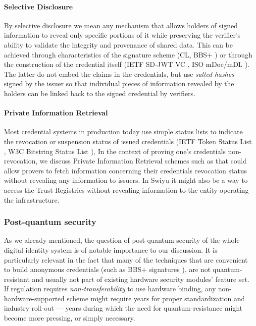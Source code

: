 \paragraph{Selective Disclosure} By selective disclosure we mean any mechanism that allows holders of signed information to reveal only specific portions of it while preserving the verifier's ability to validate the integrity and provenance of shared data. This can be achieved through characteristics of the signature scheme (CL, BBS+ \cite{ASM06}) or through the construction of the credential itself (IETF SD-JWT VC \cite{SDJWT}, ISO mDoc/mDL \cite{ISO18013-5_2021}).
The latter do not embed the claims in the credentials, but use \emph{salted hashes} signed by the issuer so that individual pieces of information revealed by the holders can be linked back to the signed credential by verifiers.

\paragraph{Private Information Retrieval} Most credential systems in production today use simple status lists to indicate the revocation or suspension status of issued credentials (IETF Token Status List \cite{TSL}, W3C Bitstring Status List \cite{W3C-status-lists}), In the context of proving one's credentials non-revocation, we discuss Private Information Retrieval schemes such as \cite{MW22} that could allow provers to fetch information concerning their credentials revocation status without revealing any information to issuers. In Swiyu \cite{Swiyu} it might also be a way to access the Trust Registries without revealing information to the entity operating the infrastructure.

\subsubsection{Post-quantum security} As we already mentioned, the question of post-quantum security of the whole digital identity system is of notable importance to our discussion.
It is particularly relevant in the fact that many of the techniques that are convenient to build anonymous credentials (such as BBS+ signatures \cite{ASM06}), are not quantum-resistant and usually not part of existing hardware security modules' feature set. If regulation requires \emph{non-transferability} to use hardware binding, any non-hardware-supported scheme might require years for proper standardization and industry roll-out --- years during which the need for quantum-resistance might become more pressing, or simply necessary.
